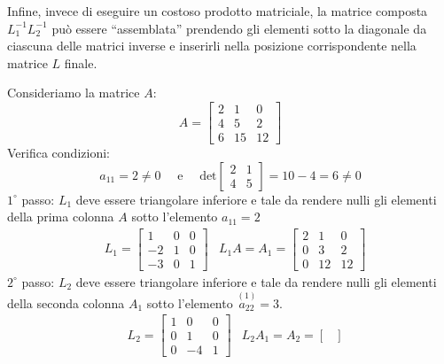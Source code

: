 \documentclass{article}
\begin{document}
Infine, invece di eseguire un costoso prodotto matriciale, la matrice composta
$L_{1}^{-1}L_{2}^{-1}$ può essere ``assemblata'' prendendo gli elementi sotto
la diagonale da ciascuna delle matrici inverse e inserirli nella posizione
corrispondente nella matrice $L$ finale.
\begin{example}
    Consideriamo la matrice $A$:
    $$A=\begin{bmatrix}
        2 & 1 & 0 \\ 
        4 & 5 & 2 \\ 
        6 & 15 & 12
    \end{bmatrix}$$ 
    Verifica condizioni:
    $$a_{11}=2\neq0 \quad \text{ e } \quad \text{det}\begin{bmatrix}
        2 & 1 \\ 
        4 &  5
    \end{bmatrix}=10-4=6\neq0$$
    $1^{\circ}$ passo: $L_1$ deve essere triangolare inferiore e tale da
    rendere nulli gli elementi della prima colonna $A$ sotto l'elemento
    $a_{11}=2$
    \begin{equation*}
       \begin{aligned}
           & L_1=
           \begin{bmatrix}
               1 & 0 & 0 \\ 
               -2 & 1 & 0 \\ 
               -3 & 0 & 1
           \end{bmatrix}
           & L_1A=A_1=\begin{bmatrix}
               2 & 1 & 0 \\ 
               0 & 3 & 2 \\ 
               0 & 12 & 12
           \end{bmatrix}
       \end{aligned} 
    \end{equation*}
    $2^{\circ}$ passo: $L_2$ deve essere triangolare inferiore e tale da rendere
    nulli gli elementi della seconda colonna $A_1$ sotto l'elemento
    $\overset{(1)}{a_{22}}=3$.
    \begin{equation*}
       \begin{aligned}
           & L_2=
           \begin{bmatrix}
               1 & 0 & 0 \\ 
               0 & 1 & 0 \\ 
               0 & -4 & 1
           \end{bmatrix}
           & L_2A_1=A_2=\begin{bmatrix}

\end{bmatrix}
\end{aligned}
\end{equation*}
\end{example}
\end{document}
